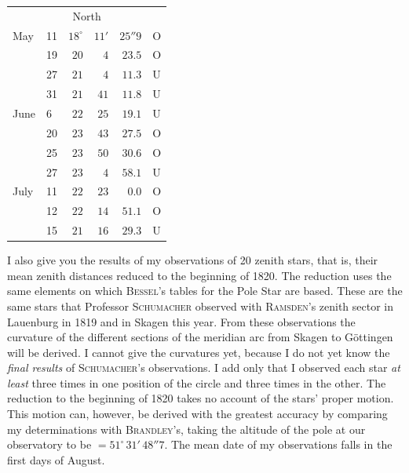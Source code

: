 \begin{center}
\begin{tabular}{ll|r r r l}
\multicolumn{6}{c}{North} \\
May & 11 & $18^\circ$ & $11'$ & $25''9$ & O \\
 & 19 & $20$ & $4$ & $23.5$ & O \\
 & 27 & $21$ & $4$ & $11.3$ & U \\
 & 31 & $21$ & $41$ & $11.8$ & U \\
June & 6 & $22$ & $25$ & $19.1$ & U \\
 & 20 & $23$ & $43$ & $27.5$ & O \\
 & 25 & $23$ & $50$ & $30.6$ & O \\
 & 27 & $23$ & $4$ & $58.1$ & U \\
July & 11 & $22$ & $23$ & $0.0$ & O \\
 & 12 & $22$ & $14$ & $51.1$ & O \\
 & 15 & $21$ & $16$ & $29.3$ & U \\
\end{tabular}
\end{center}

I also give you the results of my observations of 20 zenith stars, that is, their mean zenith distances reduced to the beginning of 1820. The reduction uses the same elements on which \textsc{Bessel}’s tables for the Pole Star are based. These are the same stars that Professor \textsc{Schumacher} observed with \textsc{Ramsden}’s zenith sector in Lauenburg in 1819 and in Skagen this year. From these observations the curvature of the different sections of the meridian arc from Skagen to Göttingen will be derived. I cannot give the curvatures yet, because I do not yet know the \emph{final results} of \textsc{Schumacher}’s observations. I add only that I observed each star \emph{at least} three times in one position of the circle and three times in the other. The reduction to the beginning of 1820 takes no account of the stars’ proper motion. This motion can, however, be derived with the greatest accuracy by comparing my determinations with \textsc{Brandley}’s, taking the altitude of the pole at our observatory to be $=51^\circ\,31'\,48''7$. The mean date of my observations falls in the first days of August.

